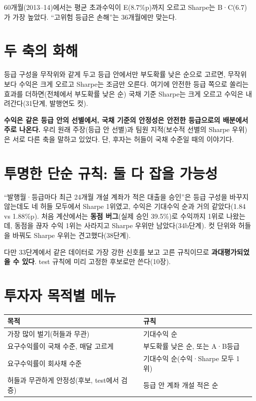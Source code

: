 \begin{warnbox}
60개월(2013--14)에서는 평균 초과수익이 E(8.7\%p)까지 오르고 Sharpe는 B·\allowbreak{}C(6.7)가 가장 높았다. ``고위험 등급은 손해''는 36개월에만 맞는다.
\end{warnbox}

\section{두 축의 화해}
등급 구성을 무작위와 같게 두고 등급 안에서만 부도확률 낮은 순으로 고르면, 무작위보다 수익은 크게 오르고 Sharpe는 조금만 오른다. 여기에 안전한 등급 쪽으로 쏠리는 효과를 더하면(전체에서 부도확률 낮은 순) 국채 기준 Sharpe는 크게 오르고 수익은 내려간다(31단계, 발행연도 컷).

\begin{keybox}[화해]
\textbf{수익은 같은 등급 안의 선별에서, 국채 기준의 안정성은 안전한 등급으로의 배분에서 주로 나온다.} 우리 원래 주장(등급 안 선별)과 팀원 지적(보수적 선별의 Sharpe 우위)은 서로 다른 축을 말하고 있었다. 단, 후자는 허들이 국채 수준일 때의 이야기다.
\end{keybox}

\section{투명한 단순 규칙: 둘 다 잡을 가능성}
``발행월·\allowbreak{}등급마다 최근 24개월 개설 계좌가 적은 대출을 승인''은 등급 구성을 바꾸지 않는데도 네 허들 모두에서 Sharpe 1위였고, 수익은 기대수익 순과 거의 같았다(1.84 vs 1.88\%p). 처음 계산에서는 \textbf{동점 버그}(실제 승인 39.5\%)로 수익까지 1위로 나왔는데, 동점을 끊자 수익 1위는 사라지고 Sharpe 우위만 남았다(34b단계). 컷 단위와 허들을 바꿔도 Sharpe 우위는 견고했다(38단계).

다만 33단계에서 같은 데이터로 가장 강한 신호를 보고 고른 규칙이므로 \textbf{과대평가되었을 수 있다}. test 규칙에 미리 고정한 후보로만 쓴다(10장).

\section{투자자 목적별 메뉴}
\begin{table}[H]\centering\small
\begin{tabularx}{\linewidth}{@{}p{55mm}L@{}}\toprule
목적 & 규칙\\\midrule
가장 많이 벌기(허들과 무관) & 기대수익 순\\
요구수익률이 국채 수준, 매달 고르게 & 부도확률 낮은 순, 또는 A·\allowbreak{}B등급\\
요구수익률이 회사채 수준 & 기대수익 순(수익·\allowbreak{}Sharpe 모두 1위)\\
허들과 무관하게 안정성(후보, test에서 검증) & 등급 안 계좌 개설 적은 순\\\bottomrule
\end{tabularx}
\end{table}
